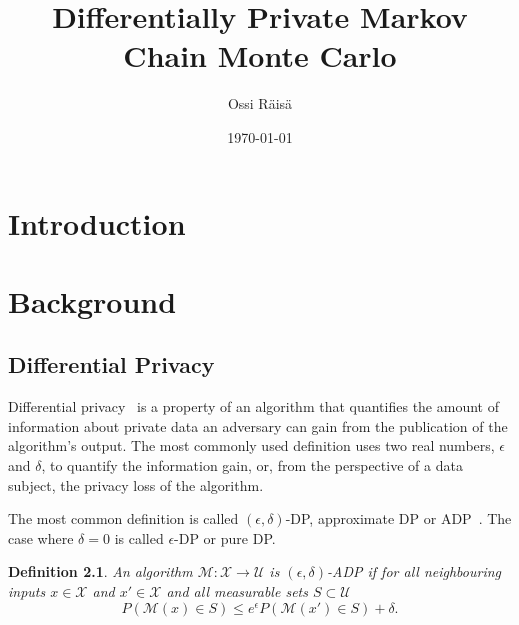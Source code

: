 \documentclass[english,twoside,openright]{HYgraduMLDS}
\title{Differentially Private Markov Chain Monte Carlo}
\author{Ossi Räisä}
\date{\today}
\newtheorem{definition}{Definition}
\newcommand{\calm}{{\mathcal{M}}}
\newcommand{\calx}{{\mathcal{X}}}
\newcommand{\calu}{{\mathcal{U}}}
\begin{document}
\maketitle


\begin{abstract}
 
\end{abstract}

\mytableofcontents

\mynomenclature

\chapter{Introduction}

\chapter{Background}

\section{Differential Privacy}\label{DP_background}

Differential privacy~\cite{DwR14} is a property of an algorithm that quantifies the 
amount of information about private data an adversary can gain from the 
publication of the algorithm's output.
The most commonly used definition uses two real numbers, 
\(\epsilon\) and \(\delta\), to quantify the information gain, or, from the 
perspective of a data subject, the privacy loss of the algorithm.

The most common definition is called \((\epsilon, \delta)\)-DP, approximate DP 
or ADP~\cite{DwR14}.
The case where \(\delta = 0\) is called \(\epsilon\)-DP or 
pure DP.

\begin{definition}\label{ADP-definition}
    An algorithm \(\calm\colon \calx \to \calu\) is \((\epsilon, \delta)\)-ADP if 
    for all neighbouring inputs \(x\in \calx\) and \(x'\in \calx\) and 
    all measurable sets \(S \subset \calu\)
    \[
        P(\calm(x)\in S) \leq e^\epsilon P(\calm(x')\in S) + \delta.
    \]
\end{definition}
\end{document}
